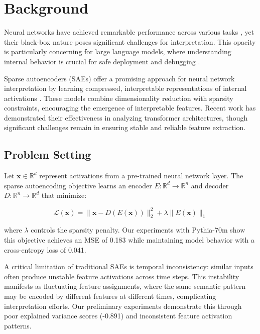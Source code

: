 \documentclass{article} %
\begin{document}
\section{Background}
\label{sec:background}

Neural networks have achieved remarkable performance across various tasks \cite{goodfellow2016deep}, yet their black-box nature poses significant challenges for interpretation. This opacity is particularly concerning for large language models, where understanding internal behavior is crucial for safe deployment and debugging \cite{vaswani2017attention}.

Sparse autoencoders (SAEs) offer a promising approach for neural network interpretation by learning compressed, interpretable representations of internal activations \cite{kingma2014adam}. These models combine dimensionality reduction with sparsity constraints, encouraging the emergence of interpretable features. Recent work has demonstrated their effectiveness in analyzing transformer architectures, though significant challenges remain in ensuring stable and reliable feature extraction.

\subsection{Problem Setting}
\label{subsec:problem_setting}

Let $\mathbf{x} \in \mathbb{R}^d$ represent activations from a pre-trained neural network layer. The sparse autoencoding objective learns an encoder $E: \mathbb{R}^d \rightarrow \mathbb{R}^n$ and decoder $D: \mathbb{R}^n \rightarrow \mathbb{R}^d$ that minimize:

\begin{equation}
    \mathcal{L}(\mathbf{x}) = \|\mathbf{x} - D(E(\mathbf{x}))\|_2^2 + \lambda\|E(\mathbf{x})\|_1
\end{equation}

where $\lambda$ controls the sparsity penalty. Our experiments with Pythia-70m show this objective achieves an MSE of 0.183 while maintaining model behavior with a cross-entropy loss of 0.041.

A critical limitation of traditional SAEs is temporal inconsistency: similar inputs often produce unstable feature activations across time steps. This instability manifests as fluctuating feature assignments, where the same semantic pattern may be encoded by different features at different times, complicating interpretation efforts. Our preliminary experiments demonstrate this through poor explained variance scores (-0.891) and inconsistent feature activation patterns.
\end{document}
